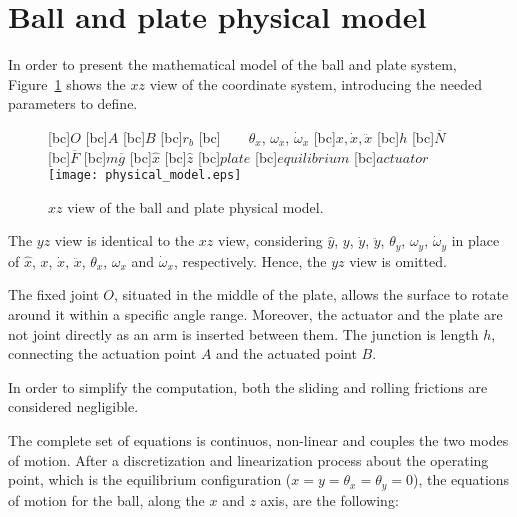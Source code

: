 
\section{Ball and plate physical model}
\label{sec:sysmodel}

In order to present the mathematical model of the ball and plate system,
Figure~\ref{fig:model} shows the $xz$ view of the coordinate
system, introducing the needed parameters to define.

\begin{figure}[htb]
  \centering
  [bc]{\small$O$}
  [bc]{\small$A$}
  [bc]{\small$B$}
  [bc]{\small$r_b$}
  [bc]{\small\ \ \ \ $\theta_x$, $\omega_x$, $\dot{\omega}_x$}
  [bc]{\small$x, \dot{x}, \ddot{x}$}
  [bc]{\small$h$}
  [bc]{\small$\overline{N}$}
  [bc]{\small$\overline{F}$}
  [bc]{\small$m\overline{g}$}
  [bc]{\small$\hat{x}$}
  [bc]{\small$\hat{z}$}
  [bc]{\small$plate$}
  [bc]{\small$equilibrium$}
  [bc]{\small$actuator$}
  \texttt{[image: physical\_model.eps]}
  \caption{$xz$ view of the ball and plate physical model.}
  \label{fig:model}
\end{figure}

\noindent The $yz$ view is identical to the $xz$
view, considering $\hat{y}$, $y$, $\dot{y}$, $\ddot{y}$, $\theta_y$,
$\omega_y$, $\dot{\omega}_y$ in place of $\hat{x}$, $x$, $\dot{x}$,
$\ddot{x}$, $\theta_x$, $\omega_x$ and $\dot{\omega}_x$, respectively.
Hence, the $yz$ view is omitted.

The fixed joint $O$, situated in the middle of the plate,
allows the surface to rotate around it within a specific angle range.
Moreover, the actuator and the plate are not joint directly as an arm
is inserted between them. The junction is length $h$, connecting the actuation
point $A$ and the actuated point $B$.

In order to simplify the computation, both the sliding and rolling frictions are
considered negligible.

The complete set of equations is continuos, non-linear and couples the two modes
of motion. After a discretization and linearization process about the operating
point, which is the equilibrium configuration
($x = y = \theta_x = \theta_y = 0$), the equations of motion for the ball,
along the $x$ and $z$ axis, are the following:

